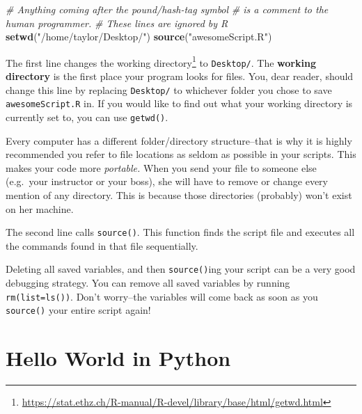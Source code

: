 \documentclass[12pt,krantz2]{krantz}
\makeatletter
\newenvironment{Shaded}{\begin{snugshade}}{\end{snugshade}}
\newcommand{\CommentTok}[1]{\textcolor[rgb]{0.37,0.37,0.37}{\textit{#1}}}
\newcommand{\KeywordTok}[1]{\textcolor[rgb]{0.27,0.27,0.27}{\textbf{#1}}}
\newcommand{\NormalTok}[1]{#1}
\newcommand{\StringTok}[1]{\textcolor[rgb]{0.5,0.5,0.5}{#1}}
\renewcommand{\href}[2]{#2\footnote{\url{#1}}}
\newenvironment{kframe}{%
\medskip{}
\setlength{\fboxsep}{.8em}
 \def\at@end@of@kframe{}%
 \ifinner\ifhmode%
  \def\at@end@of@kframe{\end{minipage}}%
  \begin{minipage}{\columnwidth}%
 \fi\fi%
 \def\FrameCommand##1{\hskip\@totalleftmargin \hskip-\fboxsep
 \colorbox{shadecolor}{##1}\hskip-\fboxsep
     \hskip-\linewidth \hskip-\@totalleftmargin \hskip\columnwidth}%
 \MakeFramed {\advance\hsize-\width
   \@totalleftmargin\z@ \linewidth\hsize
   \@setminipage}}%
 {\par\unskip\endMakeFramed%
 \at@end@of@kframe}
\renewenvironment{Shaded}{\begin{kframe}}{\end{kframe}}
\makeatother
\begin{document}
\begin{Shaded}
\begin{Highlighting}[]
\CommentTok{# Anything coming after the pound/hash-tag symbol}
\CommentTok{# is a comment to the human programmer.}
\CommentTok{# These lines are ignored by R}
\KeywordTok{setwd}\NormalTok{(}\StringTok{"/home/taylor/Desktop/"}\NormalTok{)}
\KeywordTok{source}\NormalTok{(}\StringTok{"awesomeScript.R"}\NormalTok{)}
\end{Highlighting}
\end{Shaded}

The first line changes the \href{https://stat.ethz.ch/R-manual/R-devel/library/base/html/getwd.html}{working directory} to \texttt{Desktop/}. The \textbf{working directory} is the first place your program looks for files. You, dear reader, should change this line by replacing \texttt{Desktop/} to whichever folder you chose to save \texttt{awesomeScript.R} in. If you would like to find out what your working directory is currently set to, you can use \texttt{getwd()}.

\begin{rmd-details}
Every computer has a different folder/directory structure--that is why it is highly recommended you refer to file locations as seldom as possible in your scripts. This makes your code more \emph{portable.} When you send your file to someone else (e.g.~your instructor or your boss), she will have to remove or change every mention of any directory. This is because those directories (probably) won't exist on her machine.

\end{rmd-details}

The second line calls \texttt{source()}. This function finds the script file and executes all the commands found in that file sequentially.

\begin{rmd-details}
Deleting all saved variables, and then \texttt{source()}ing your script can be a very good debugging strategy. You can remove all saved variables by running \texttt{rm(list=ls())}. Don't worry--the variables will come back as soon as you \texttt{source()} your entire script again!

\end{rmd-details}

\hypertarget{hello-world-in-python}{%
\section{Hello World in Python}\label{hello-world-in-python}}
\end{document}
